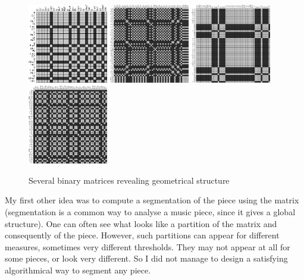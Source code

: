 \documentclass[a4paper,10pt]{article}
\begin{document}
\begin{figure}[h]
\centering
\includegraphics[width=3.5cm]{images/pretty1.jpg}\hspace{0.5cm}
\includegraphics[width=3.5cm]{images/pretty2.jpg}\hspace{0.5cm}
\includegraphics[width=3.5cm]{images/pretty3.jpg}\hspace{0.5cm}
\includegraphics[width=3.5cm]{images/pretty4.jpg}
\caption{Several binary matrices revealing geometrical structure\label{pretty}}
\end{figure}

My first other idea was to compute a segmentation of the piece using the matrix (segmentation is a common way to analyse a music piece, since it gives a global structure). One can often see what looks like a partition of the matrix and consequently of the piece. However, such partitions can appear for different measures, sometimes very different thresholds. They may not appear at all for some pieces, or look very different. So I did not manage to design a satisfying algorithmical way to segment any piece.
\end{document}
